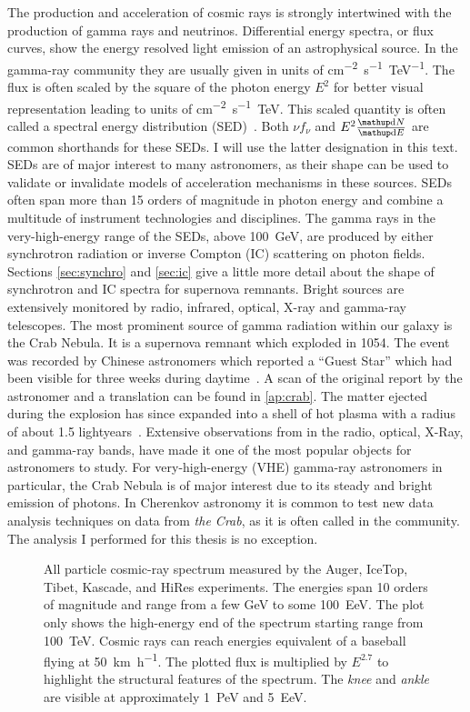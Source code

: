 The production and acceleration of cosmic rays is strongly intertwined with the production of gamma rays and neutrinos.
Differential energy spectra, or flux curves,  show the energy resolved light emission of an astrophysical source.
In the gamma-ray community they are usually given in units of \si{cm^{-2}.s^{-1}.TeV^{-1}}. The flux is often scaled 
by the square of the photon energy $E^2$ for better visual representation leading to units of \si{cm^{-2}.s^{-1}.TeV}.
This scaled quantity is often called a spectral energy distribution (SED)~\cite[3]{gaisser}.
Both $\nu f_{\nu}$ and $E^2 \frac{\diff{N}}{\diff{E}}$ are common shorthands for these SEDs. I will use the latter designation
in this text.
SEDs are of major interest to many astronomers, as their shape can be used to validate or invalidate models of acceleration mechanisms in these sources.
SEDs often span more than 15 orders of magnitude in photon energy and combine a multitude of instrument technologies and 
disciplines. 
The gamma rays in the very-high-energy range of the SEDs, above \SI{100}{GeV}, are produced by either synchrotron radiation or inverse Compton (IC) scattering
on photon fields. Sections \ref{sec:synchro} and \ref{sec:ic} give a little more detail about the shape of synchrotron and IC spectra
for supernova remnants.
Bright sources are extensively monitored by radio, infrared, optical, X-ray and gamma-ray telescopes.
The most prominent source of gamma radiation within our galaxy is the Crab Nebula.
It is a supernova remnant which exploded in 1054. The event was recorded by Chinese astronomers which reported a
\enquote{Guest Star} which had been visible for three weeks during daytime~\cite{crab_chimera}.
A scan of the original report by the astronomer and a translation can be found in \cref{ap:crab}.
The matter ejected during the explosion has since expanded into a shell of hot plasma with a radius of about 1.5 lightyears~\cite{crab_chimera}.
Extensive observations from in the radio, optical, X-Ray, and gamma-ray bands, have made it
one of the most popular objects for astronomers to study.
For very-high-energy (VHE) gamma-ray astronomers in particular, the Crab Nebula is of major interest due to its steady and bright emission of photons.
In Cherenkov astronomy it is common to test new data analysis techniques on data from \emph{the Crab}, as it is often called in the
community. The analysis I performed for this thesis is no exception.
\begin{figure}
  \centering
  
  \caption[The all-particle cosmic-ray spectrum.]{All particle cosmic-ray spectrum measured by the Auger, IceTop, Tibet, Kascade, and HiRes experiments.
  The energies span 10 orders of magnitude and range from a few \si{\GeV} to some \SI{100}{EeV}. The plot only shows
  the high-energy end of the spectrum starting range from \SI{100}{\TeV}.
  Cosmic rays can reach energies equivalent of a baseball flying at \SI[per-mode=fraction,fraction-function=\nicefrac]{50}{\kilo\metre\per\hour}.
  The plotted flux is multiplied by $E^{2.7}$ to highlight the structural features of the spectrum. The \emph{knee} and \emph{ankle}
  are visible at approximately \SI{1}{PeV} and \SI{5}{EeV}.}
  \label{fig:cosmic_rays}
\end{figure}
\newpage
